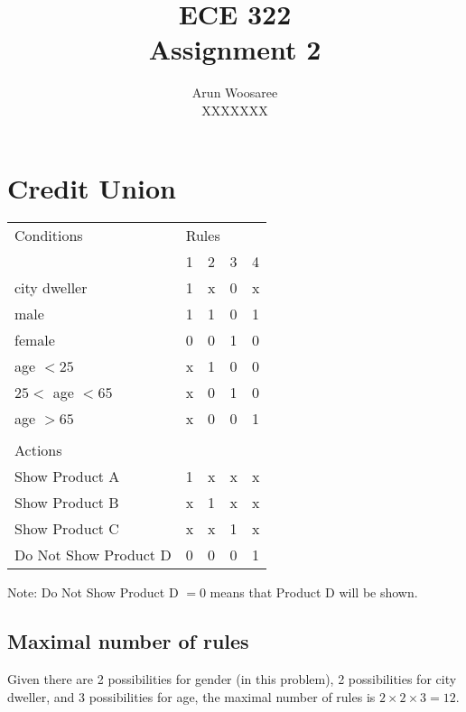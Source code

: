 \documentclass[letterpaper]{article}
\title{ECE 322 \\
Assignment 2}
\author{Arun Woosaree\\
  XXXXXXX}
\begin{document}
\maketitle %

\section{Credit Union}
\begin{adjustbox}{center}
	\begin{tabular}{lllll}
		Conditions            & \multicolumn{4}{l}{Rules}             \\
		                      & 1                         & 2 & 3 & 4 \\ \cline{2-5}
		city dweller          & 1                         & x & 0 & x \\
		male                  & 1                         & 1 & 0 & 1 \\
		female                & 0                         & 0 & 1 & 0 \\
		age $<25$             & x                         & 1 & 0 & 0 \\
		$25<$ age $<65$       & x                         & 0 & 1 & 0 \\
		age $>65$             & x                         & 0 & 0 & 1 \\
		                      &                           &   &   &   \\
		Actions               &                           &   &   &   \\ \cline{1-1}
		Show Product A        & 1                         & x & x & x \\
		Show Product B        & x                         & 1 & x & x \\
		Show Product C        & x                         & x & 1 & x \\
		Do Not Show Product D & 0                         & 0 & 0 & 1 \\
	\end{tabular}%
\end{adjustbox}
Note: Do Not Show Product D $=0$ means that Product D will be shown.

\subsection{Maximal number of rules}
Given there are 2 possibilities for gender (in this problem), 2 possibilities
for city dweller, and 3 possibilities for age, the maximal number of rules is
$2 \times 2 \times 3 = 12$. 
\end{document}
